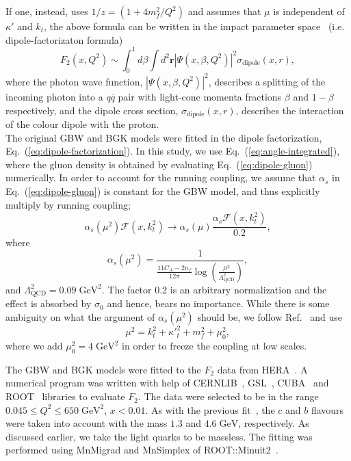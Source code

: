 \documentclass[12pt]{article}
\numberwithin{equation}{section}
\numberwithin{table}{section}
\numberwithin{figure}{section}
\newcommand{\GeV}[0]{\mathrm{GeV}}
\begin{document}
If one, instead, uses $ 1/z=\left(1+4 m_f^2/Q^2\right)$ and assumes that $\mu$ is independent of $\kappa'$ and $k_t$, 
the above formula can be written in the impact parameter space~\cite{Golec-Biernat:1998zce} (i.e. dipole-factorizaton formula)
\begin{equation}
F_2\left(x,Q^2\right)\sim\int^1_0d\beta \int d^2\mathbf{r}\left|\Psi\left(x,\beta,Q^2\right)\right|^2\sigma_{\mathrm{dipole}}\left(x,r\right),
\label{eq:dipole-factorization}
\end{equation}
where the photon wave function, $\left|\Psi\left(x,\beta,Q^2\right)\right|^2$, describes a splitting of the incoming photon into a $q\overline{q}$ pair with light-cone momenta fractions $\beta$ and $1-\beta$ respectively, and the dipole cross section, $\sigma_{\mathrm{dipole}}\left(x,r\right)$, describes the interaction of the colour dipole with the proton.\\

The original GBW and BGK models were fitted in the dipole factorization, Eq.~(\ref{eq:dipole-factorization}). In this study, we use Eq.~(\ref{eq:angle-integrated}), where the gluon density is obtained by evaluating Eq.~(\ref{eq:dipole-gluon}) numerically.
In order to account for the running coupling, we assume that $\alpha_s$ in Eq.~(\ref{eq:dipole-gluon}) is constant for the GBW model, and thus explicitly multiply by running coupling;
\begin{equation}
\alpha_s(\mu^2)\mathcal{F}(x,k_t^2)\rightarrow \alpha_s(\mu)\frac{\alpha_s\mathcal{F}(x,k_t^2)}{0.2},
\end{equation}
where %
\begin{equation}
\alpha_s(\mu^2)=\frac{1}{\frac{11 C_A-2n_f}{12\pi}\log\left(\frac{\mu^2}{\Lambda_{\mathrm{QCD}}^2 }\right)},
\end{equation}
and  $\Lambda_{\mathrm{QCD}}^2=0.09\;\GeV^2$.
The factor 0.2 is an arbitrary normalization and the effect is absorbed by $\sigma_0$ and hence, bears no importance.
While there is some ambiguity on what the argument of $\alpha_s(\mu^2)$ should be, we follow Ref.~\cite{Kwiecinski:1997ee} and use
\begin{equation}
	\mu^2=k_t^2+{\kappa'}_t^2+m_f^2+\mu^2_0,
\end{equation}
where we add $\mu^2_0=4\;\GeV^2$ in order to freeze the coupling at low scales.

The GBW and BGK models were fitted to the $F_2$ data from HERA~\cite{Abt:2017nkc}. A numerical program was written with help of CERNLIB~\cite{Kolbig:1972zz}, GSL~\cite{GSL}, CUBA~\cite{Hahn:2004fe} and ROOT~\cite{Brun:1997pa} libraries to evaluate $F_2$. The data were selected to be in the range $0.045\leq Q^2\leq 650\;\mathrm{GeV^2}$, $x<0.01$.
As with the previous fit~\cite{Goda:2022wsc}, the $c$ and $b$ flavours were taken into account with the mass $1.3$ and $4.6\;\mathrm{GeV}$, respectively. As discussed earlier, we take the light quarks to be massless.
The fitting was performed using MnMigrad and MnSimplex of ROOT::Minuit2~\cite{James:2004xla}.
\end{document}
